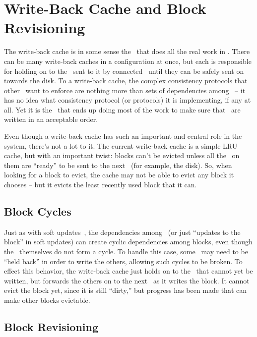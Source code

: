 \section{Write-Back Cache and Block Revisioning}
\label{sec:wbcache}

The write-back cache is in some sense the \module\ that does all the real work
in \Kudos. There can be many write-back caches in a configuration at once, but
each is responsible for holding on to the \chdescs\ sent to it by connected
\modules\ until they can be safely sent on towards the disk. To a write-back
cache, the complex consistency protocols that other \modules\ want to enforce
are nothing more than sets of dependencies among \chdescs\ -- it has no idea
what consistency protocol (or protocols) it is implementing, if any at all. Yet
it is the \module\ that ends up doing most of the work to make sure that
\chdescs\ are written in an acceptable order.

Even though a write-back cache has such an important and central role in the
system, there's not a lot to it. The current write-back cache is a simple LRU
cache, but with an important twist: blocks can't be evicted unless all the
\chdescs\ on them are ``ready'' to be sent to the next \module\ (for example,
the disk). So, when looking for a block to evict, the cache may not be able to
evict any block it chooses -- but it evicts the least recently used block that
it can.

\subsection{Block Cycles}
\label{sec:wbcache:cycles}

Just as with soft updates~\cite{ganger00soft}, the dependencies among \chdescs\
(or just ``updates to the block'' in soft updates) can create cyclic
dependencies among blocks, even though the \chdescs\ themselves do not form a
cycle. To handle this case, some \chdescs\ may need to be ``held back'' in order
to write the others, allowing such cycles to be broken. To effect this behavior,
the write-back cache just holds on to the \chdescs\ that cannot yet be written,
but forwards the others on to the next \module\ as it writes the block. It
cannot evict the block yet, since it is still ``dirty,'' but progress has been
made that can make other blocks evictable.

\subsection{Block Revisioning}

